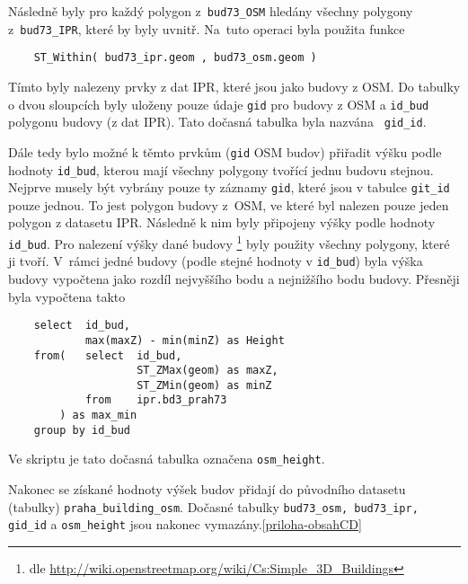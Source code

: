Následně byly pro každý polygon z~{\tt bud73\_OSM} hledány
všechny polygony z~{\tt bud73\_IPR}, které by byly uvnitř.
Na~tuto operaci byla použita funkce
\begin{verbatim}
    ST_Within( bud73_ipr.geom , bud73_osm.geom )
\end{verbatim}
Tímto byly nalezeny prvky z dat IPR, které jsou  jako budovy z OSM. Do tabulky o dvou sloupcích byly
uloženy pouze údaje {\tt gid} pro budovy z OSM a {\tt id\_bud}
polygonu budovy (z dat IPR). Tato dočasná tabulka byla nazvána {\tt
  gid\_id}.

Dále tedy bylo možné k těmto prvkům ({\tt gid} OSM budov) přiřadit
výšku podle hodnoty {\tt id\_bud}, kterou mají všechny polygony
tvořící jednu budovu stejnou. Nejprve musely být vybrány pouze ty
záznamy {\tt gid}, které jsou v tabulce {\tt git\_id} pouze jednou.
To jest polygon budovy z~OSM, ve které byl nalezen pouze jeden polygon
z datasetu IPR. Následně k nim byly připojeny výšky podle hodnoty
{\tt id\_bud}. Pro nalezení výšky dané budovy \footnote{dle \url{http://wiki.openstreetmap.org/wiki/Cs:Simple_3D_Buildings}}
byly použity všechny polygony, které ji tvoří. V~rámci jedné budovy
(podle stejné hodnoty v {\tt id\_bud}) byla výška budovy vypočtena
jako rozdíl nejvyššího bodu a nejnižšího bodu budovy.
Přesněji byla vypočtena takto
\begin{verbatim}
    select	id_bud,
            max(maxZ) - min(minZ) as Height
    from(   select	id_bud,
                    ST_ZMax(geom) as maxZ,
                    ST_ZMin(geom) as minZ
            from    ipr.bd3_prah73
        ) as max_min
    group by id_bud
\end{verbatim}
Ve skriptu je tato dočasná tabulka označena {\tt osm\_height}.

Nakonec se získané hodnoty výšek budov přidají do původního datasetu
(tabulky) {\tt praha\_building\_osm}. 
Dočasné tabulky {\tt bud73\_osm, bud73\_ipr, gid\_id} a
{\tt osm\_height} jsou nakonec vymazány.\ref{priloha-obsahCD}
